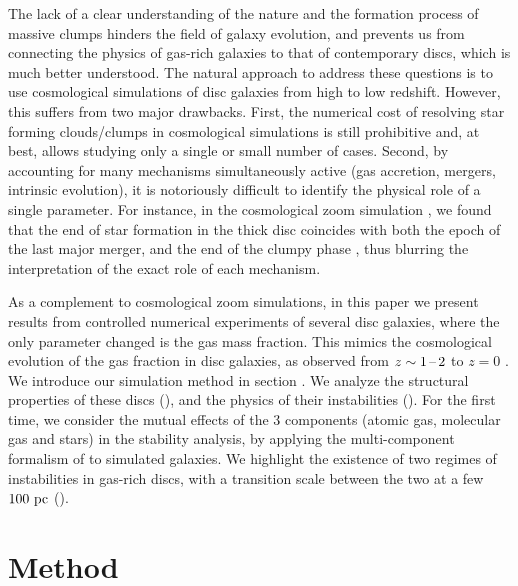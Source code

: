 \documentclass[useAMS,usenatbib]{mnras}
\begin{document}
The lack of a clear understanding of the nature and the formation process of massive clumps hinders the field of galaxy evolution, and prevents us from connecting the physics of gas-rich galaxies to that of contemporary discs, which is much better understood. The natural approach to address these questions is to use cosmological simulations of disc galaxies from high to low redshift. However, this suffers from two major drawbacks. First, the numerical cost of resolving star forming clouds/clumps in cosmological simulations is still prohibitive and, at best, allows studying only a single or small number of cases. Second, by accounting for many mechanisms simultaneously active (gas accretion, mergers, intrinsic evolution), it is notoriously difficult to identify the physical role of a single parameter. For instance, in the cosmological zoom simulation \vintergatan, we found that the end of star formation in the thick disc coincides with both the epoch of the last major merger, and the end of the clumpy phase \citep{Agertz2021,Renaud2021,Renaud2021b}, thus blurring the interpretation of the exact role of each mechanism.

As a complement to cosmological zoom simulations, in this paper we present results from controlled numerical experiments of several disc galaxies, where the only parameter changed is the gas mass fraction. This mimics the cosmological evolution of the gas fraction in disc galaxies, as observed from $z \sim 1\textrm{\,--\,} 2$ to $z=0$ \citep{Saintonge2013}. We introduce our simulation method in section . We analyze the structural properties of these discs (), and the physics of their instabilities (). For the first time, we consider the mutual effects of the 3 components (atomic gas, molecular gas and stars) in the stability analysis, by applying the multi-component formalism of \citet{Romeo2013} to simulated galaxies. We highlight the existence of two regimes of instabilities in gas-rich discs, with a transition scale between the two at a few $100 \mathrm{~pc}$ (). 


\section{Method}
\label{sec:method}
\end{document}
